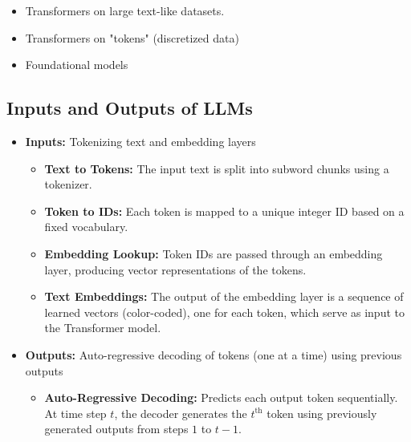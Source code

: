 \begin{summary}
    \begin{itemize}
        \item Transformers on large text-like datasets.
        \item Transformers on "tokens" (discretized data)
        \item Foundational models
    \end{itemize}
\end{summary}

\subsection{Inputs and Outputs of LLMs}
\begin{notes}
    \begin{itemize}
        \item \textbf{Inputs:} Tokenizing text and embedding layers
        \vspace{-1em}
        \begin{itemize}        
            \item \textbf{Text to Tokens:} The input text is split into subword chunks using a tokenizer.
            \item \textbf{Token to IDs:} Each token is mapped to a unique integer ID based on a fixed vocabulary.
            \item \textbf{Embedding Lookup:} Token IDs are passed through an embedding layer, producing vector representations of the tokens.
            \item \textbf{Text Embeddings:} The output of the embedding layer is a sequence of learned vectors (color-coded), one for each token, which serve as input to the Transformer model.
        \end{itemize}        
        \item \textbf{Outputs:} Auto-regressive decoding of tokens (one at a time) using previous outputs
        \vspace{-1em}
        \begin{itemize}
            \item \textbf{Auto-Regressive Decoding:} Predicts each output token sequentially. At time step $t$, the decoder generates the $t^\text{th}$ token using previously generated outputs from steps $1$ to $t-1$.
        \end{itemize}        
    \end{itemize}
\end{notes}
\newpage

